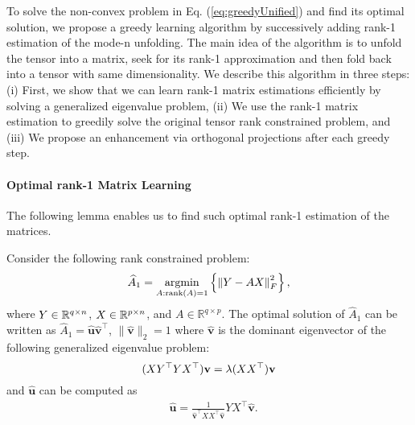 To solve the non-convex problem in Eq. (\ref{eq:greedyUnified}) and find its optimal solution, we propose a greedy learning algorithm by successively adding rank-1 estimation of the mode-n unfolding. The main idea of the algorithm is to unfold the tensor into a matrix,  seek for its rank-1 approximation and then fold back into a tensor with same dimensionality. We describe this algorithm in three steps: (i) First, we show that we can learn rank-1 matrix estimations efficiently by solving a generalized eigenvalue problem, (ii) We use the rank-1 matrix estimation to greedily solve the original tensor rank constrained problem, and (iii) We propose an enhancement via orthogonal projections after each greedy step.

\paragraph{Optimal rank-1 Matrix Learning} %
The following lemma enables us to find such optimal rank-1 estimation of the matrices.

\begin{lemma}
\label{lem:rank1opt}
Consider the following rank constrained problem:
\begin{equation}
\widehat{A}_1 = \operatorname*{argmin}_{A: \mathrm{rank}(A) = 1} \left\{ \left\| Y - AX\right\|_F^2 \right\},
\label{eq:rank1estimate}
\end{equation}
\noindent where $Y \in {{\mathbb R}}^{q\times n}$, $X \in {{\mathbb R}}^{p\times n}$, and $A\in \mathbb{R}^{q\times p}$. The optimal solution of $\widehat{A}_1$ can be written as $\widehat{A}_1 = \widehat{\mathbf{u}}\widehat{\mathbf{v}}^{\top}$, $\|\widehat{\mathbf{v}}\|_2 = 1$ where $\widehat{\mathbf{v}}$ is the dominant eigenvector of the following generalized eigenvalue problem:
\begin{equation}
(XY^{\top}YX^{\top})\mathbf{v} = \lambda (XX^{\top})\mathbf{v}\label{eq:solv}\\
\end{equation}
and $\widehat{\mathbf{u}}$ can be computed as
\begin{align}
&\widehat{\mathbf{u}} = \frac{1}{\widehat{\mathbf{v}}^{\top}XX^{\top}\widehat{\mathbf{v}}}YX^{\top}\widehat{\mathbf{v}}. \label{eq:solu}
\end{align}
\end{lemma}


